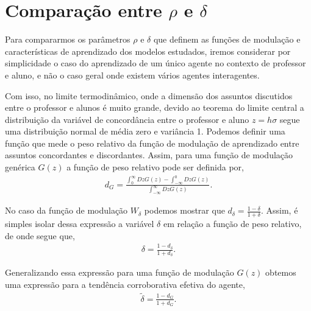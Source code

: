 \section{Comparação entre $\rho$ e $\delta$} %

Para compararmos os parâmetros $\rho$ e $\delta$ que definem as funções
de modulação e características de aprendizado dos modelos estudados, iremos
considerar por simplicidade o caso do aprendizado de um único agente no
contexto de professor e aluno, e não o caso geral onde existem vários
agentes interagentes.

Com isso, no limite termodinâmico, onde a dimensão dos assuntos discutidos
entre o professor e alunos é muito grande, devido ao teorema do limite
central \cite{Engel2004} a distribuição da variável de concordância
entre o professor e aluno $ z = h \sigma$ segue uma distribuição normal de
média zero e variância 1. Podemos definir uma função que mede
o peso relativo da função de modulação de aprendizado entre assuntos
concordantes e discordantes. Assim, para uma função de modulação genérica
$G(z)$ a função de peso relativo pode ser definida por,
\begin{align}
    d_G = \frac{\int_0^\infty D z G(z) - \int_{-\infty}^0 D z G(z)}
            {\int_{-\infty}^\infty D z G(z)}.
\end{align}

No caso da função de modulação $W_\delta$ podemos mostrar que 
$
d_\delta = \frac{1 - \delta}{1 + \delta}.
$
Assim, é simples isolar dessa expressão a variável $\delta$ em
relação a função de peso relativo, de onde segue que, 
\begin{align}
    \delta = \frac{1 - d_\delta}{1 + d_\delta}.
\end{align}

Generalizando essa expressão para uma função de modulação $G(z)$
obtemos uma expressão para a tendência corroborativa efetiva do agente,
\begin{align}
    \tilde \delta = \frac{1 - d_G}{1 + d_G}.
\end{align}

